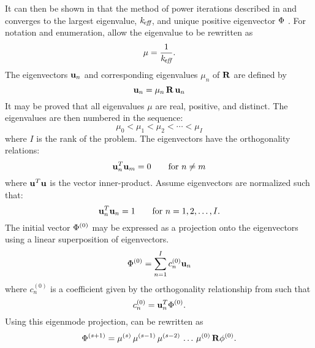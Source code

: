     It can then be shown in that the method of power iterations described in 
     and 
    converges to the largest eigenvalue, $k_{\!\mbox{\scriptsize \em eff}}$, and unique positive 
    eigenvector $\Phi$ \cite{nakamura}. For notation and enumeration, allow the 
    eigenvalue to be rewritten as
    \begin{equation}
      \label{eq:mu}
      \mu = \frac{1}{k_{\!\mbox{\scriptsize \em eff}}}.
    \end{equation}
    The eigenvectors $\mathbf{u}_n$ and
    corresponding eigenvalues $\mu_n$ of $\mathbf{R}$ are defined by
    \begin{equation}
      \label{eq:eigen_definition}
      \mathbf{u}_n = \mu_n \, \mathbf{R} \, \mathbf{u}_n
    \end{equation}
    It may be proved that all eigenvalues $\mu$ are real, positive, and 
    distinct. The eigenvalues are then numbered in the sequence:
    \begin{equation}
      \label{eq:eigen_order}
      \mu_0 < \mu_1 < \mu_2 < \cdots < \mu_I
    \end{equation}
    where $I$ is the rank of the problem. The eigenvectors have the 
    orthogonality relations:
    \begin{equation}
      \label{eq:eigen_orthogonality}
      \mathbf{u}^T_n \mathbf{u}_m = 0  \qquad \text{for } n \ne m
    \end{equation}
    where $\mathbf{u}^T \mathbf{u}$ is the vector inner-product. Assume eigenvectors are
    normalized such that:
    \begin{equation}
      \label{eq:eigen_normalization}
      \mathbf{u}_n^T \mathbf{u}_n = 1 \qquad \text{for } n = 1, 2, \ldots, I.
    \end{equation}
    The initial vector $\Phi^{(0)}$ may be expressed as a projection onto the
    eigenvectors using a linear superposition of eigenvectors.
    \begin{equation}
      \label{eq:eigen_projection}
      \Phi^{(0)} = \sum_{n=1}^{I} c_n^{(0)} \mathbf{u}_n
    \end{equation}
    where $c_n^{(0)}$ is a coefficient given by the orthogonality relationship
    from  such that
    \begin{equation}
      \label{eq:eigen_cn}
      c_n^{(0)} = \mathbf{u}_n^T \Phi^{(0)}.
    \end{equation}
    Using this eigenmode projection,  can be
    rewritten as 
    \begin{equation}
      \label{eq:phi_expand_begin}
      \Phi^{(s+1)} = \mu^{(s)} \, \mu^{(s-1)} \, \mu^{(s-2)} \, 
        \ldots \, \mu^{(0)} \, \mathbf{R} \phi^{(0)}.
    \end{equation}
